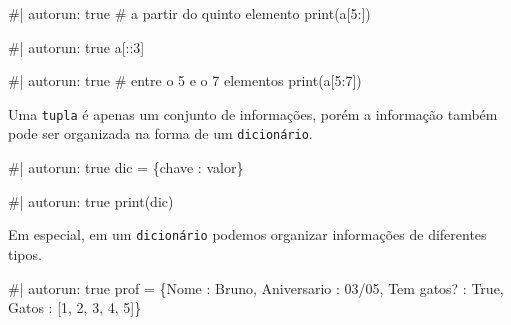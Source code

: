 \documentclass[
  letterpaper,
  DIV=11,
  numbers=noendperiod]{scrreprt}
\newenvironment{Shaded}{\begin{snugshade}}{\end{snugshade}}
\newcommand{\NormalTok}[1]{\textcolor[rgb]{0.00,0.23,0.31}{#1}}
\begin{document}
\begin{Shaded}
\begin{Highlighting}[]
\NormalTok{\#| autorun: true}
\NormalTok{\# a partir do quinto elemento}
\NormalTok{print(a[5:])}
\end{Highlighting}
\end{Shaded}

\begin{Shaded}
\begin{Highlighting}[]
\NormalTok{\#| autorun: true}
\NormalTok{a[::3]}
\end{Highlighting}
\end{Shaded}

\begin{Shaded}
\begin{Highlighting}[]
\NormalTok{\#| autorun: true}
\NormalTok{\# entre o 5 e o 7 elementos}
\NormalTok{print(a[5:7])}
\end{Highlighting}
\end{Shaded}

Uma \texttt{tupla} é apenas um conjunto de informações, porém a
informação também pode ser organizada na forma de um
\texttt{dicionário}.

\begin{Shaded}
\begin{Highlighting}[]
\NormalTok{\#| autorun: true}
\NormalTok{dic = \{\textquotesingle{}chave\textquotesingle{} : \textquotesingle{}valor\textquotesingle{}\}}
\end{Highlighting}
\end{Shaded}

\begin{Shaded}
\begin{Highlighting}[]
\NormalTok{\#| autorun: true}
\NormalTok{print(dic)}
\end{Highlighting}
\end{Shaded}

Em especial, em um \texttt{dicionário} podemos organizar informações de
diferentes tipos.

\begin{Shaded}
\begin{Highlighting}[]
\NormalTok{\#| autorun: true}
\NormalTok{prof = \{\textquotesingle{}Nome\textquotesingle{} : \textquotesingle{}Bruno\textquotesingle{},}
\NormalTok{        \textquotesingle{}Aniversario\textquotesingle{} : \textquotesingle{}03/05\textquotesingle{},}
\NormalTok{        \textquotesingle{}Tem gatos?\textquotesingle{} : True,}
\NormalTok{        \textquotesingle{}Gatos\textquotesingle{} : [1, 2, 3, 4, 5]\}}
\end{Highlighting}
\end{Shaded}
\end{document}
